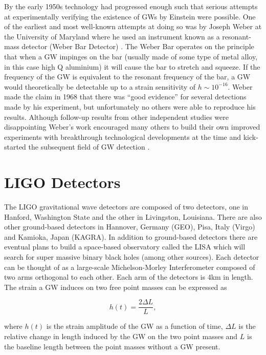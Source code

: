 By the early 1950s technology had progressed enough such that serious 
attempts at experimentally verifying the existence of \ac{GW}s by Einstein were possible. 
One of the earliest and most well-known attempts at doing so was by 
Joseph Weber at the University of Maryland where he used an instrument 
known as a resonant-mass detector (Weber Bar Detector) \cite{PhysRevLett.18.498}. The Weber Bar 
operates on the principle that when a \ac{GW} impinges on the bar (usually 
made of some type of metal alloy, in this case high Q aluminium) it will cause 
the bar to stretch and squeeze. If the frequency of the \ac{GW} is equivalent 
to the resonant frequency of the bar, a \ac{GW} would theoretically be detectable up to a strain 
sensitivity of $h\sim10^{-16}$. Weber made the claim in 1968 that there was 
``good evidence'' for several detections made by his experiment, but unfortunately 
no others were able to reproduce his results. Although follow-up results from 
other independent studies were disappointing 
Weber's work encouraged many others to build their own improved experiments with 
breakthrough technological developments at the time and 
kick-started the subsequent field of \ac{GW} detection \cite{1009.1138}.

\section{LIGO Detectors}

%
%

The \ac{LIGO} gravitational wave detectors are composed of 
two detectors, one in Hanford, Washington State and the 
other in Livingston, Louisiana. There are also other ground-based detectors 
in Hannover, Germany (GEO), Pisa, Italy (Virgo) and Kamioka, Japan 
(KAGRA). In addition to ground-based detectors there are eventual plans 
to build a space-based observatory called the \ac{LISA} which 
will search for super massive binary black holes (among other 
sources). Each detector can be thought 
of as a large-scale Michelson-Morley Interferometer composed 
of two arms orthogonal to each other. Each arm of 
the detectors is 4km in length. The strain a \ac{GW} induces on two free point masses 
can be expressed as 

\begin{equation}
    h(t) = \frac{2 \Delta L}{L},
\end{equation}

where $h(t)$ is the strain amplitude of the \ac{GW} 
as a function of time, $\Delta L$ is 
the relative change in length induced by the \ac{GW} on the two 
point masses and $L$ is the baseline length between the point 
masses without a \ac{GW} present. 

